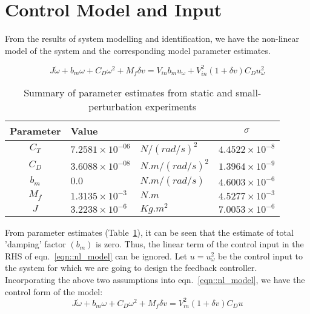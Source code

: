 \section{Control Model and Input}
From the results of system modelling and identification, we have the non-linear
model of the system and the corresponding model parameter estimates.

\begin{equation}\label{eqn::nl_model}
    J \dot \omega + b_m \omega + C_D \omega^2 + M_f \delta v = V_{in} b_m u_\omega + V_{in}^2 (1 + \delta v) C_D u_\omega^2
\end{equation}


\begin{table}[H]
    \centering
    \begin{tabular}{c l l c}
        \hline \hline
        Parameter & Value & & $\sigma$            \\ \hline \hline
        $C_T$ & $7.2581 \times 10^{-06}$ & $N/(rad/s)^2$   & $4.4522 \times 10^{-8}$ \\
        $C_D$ & $3.6088 \times 10^{-08}$ & $N.m/(rad/s)^2$ & $1.3964 \times 10^{-9}$ \\
        $b_m$ & $0.0$                    & $N.m/(rad/s)$   & $4.6003 \times 10^{-6}$  \\
        $M_f$ & $1.3135 \times 10^{-3}$  & $N.m$           & $4.5277 \times 10^{-3}$ \\
        $J$   & $3.2238 \times 10^{-6}$   & $Kg.m^2$        & $7.0053 \times 10^{-6}$ \\
        \hline \hline
    \end{tabular}
    \caption{Summary of parameter estimates from static and small-perturbation experiments}
    \label{tab::parm_ests}
\end{table}




From parameter estimates (Table~\ref{tab::parm_ests}), it can be seen that the
estimate of total 'damping' factor $( b_m )$ is zero. Thus, the linear term of
the control input in the RHS of eqn.~\ref{eqn::nl_model} can be ignored.
Let $u = u_\omega ^2 $ be the control input to the system for which we are going
to design the feedback controller. Incorporating the above two assumptions into
eqn.~\ref{eqn::nl_model}, we have the control form of the model:
\begin{equation} \label{eqn::control_form}
    J \dot \omega + b_m \omega + C_D \omega^2 + M_f \delta v = V_{in}^2 (1 + \delta v) C_D u
\end{equation}

